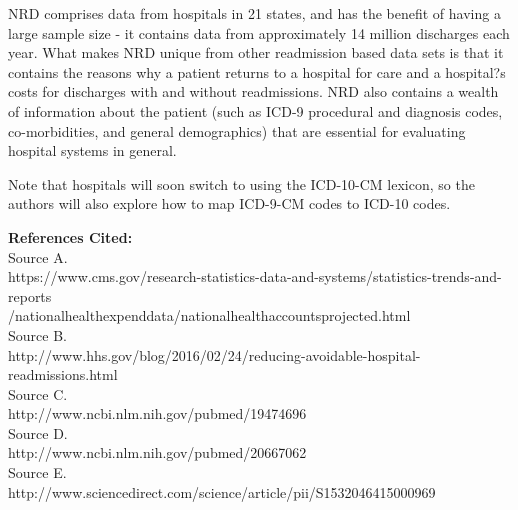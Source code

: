 \documentclass [11pt]{article}
\begin{document}
\noindent
NRD comprises data from hospitals in 21 states, and has the benefit of having a large sample size - it contains data from approximately 14 million discharges each year. What makes NRD unique from other readmission based data sets is that it contains the reasons why a patient returns to a hospital for care and a hospital?s costs for discharges with and without readmissions. NRD also contains a wealth of information about the patient (such as ICD-9 procedural and diagnosis codes, co-morbidities, and general demographics) that are essential for evaluating hospital systems in general.

\noindent
Note that hospitals will soon switch to using the ICD-10-CM lexicon, so the authors will also explore how to map ICD-9-CM codes to ICD-10 codes.  

\vspace{0.5in}
\noindent
\large
{\bf References Cited:}\\

\small
\noindent
Source A.\\
 https://www.cms.gov/research-statistics-data-and-systems/statistics-trends-and-reports\\
 /nationalhealthexpenddata/nationalhealthaccountsprojected.html \\

\noindent
Source B. \\
http://www.hhs.gov/blog/2016/02/24/reducing-avoidable-hospital-readmissions.html \\

\noindent
Source C. \\
http://www.ncbi.nlm.nih.gov/pubmed/19474696 \\

\noindent
Source D. \\
 http://www.ncbi.nlm.nih.gov/pubmed/20667062 \\

\noindent
Source E. \\
http://www.sciencedirect.com/science/article/pii/S1532046415000969 \\
\end{document}
